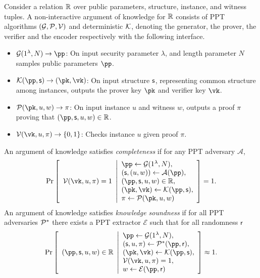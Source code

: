 \begin{definition}\label{def:nark}
   Consider a relation $\mathbb{R}$ over 
   public parameters, structure, instance, and witness tuples.
   A non-interactive argument of knowledge for $\mathbb{R}$ consists of PPT algorithms
   $(\mathcal{G}, \mathcal{P},\mathcal{V})$ 
   and deterministic $\mathcal{K}$,
   denoting the generator, 
   the prover,    
   the verifier
   and the encoder respectively with the following interface.
   \begin{itemize}
       \item $\Gn(1^{\lambda}, N) \to \pp$: 
       On input security parameter $\lambda$,
       and length parameter $N$
       samples public parameters $\pp$.
       \item $\En(\pp, \Str) \to (\pk, \vk)$: 
       On input structure $\mathsf{s}$, 
       representing common structure among instances,
       outputs the prover key $\pk$ and verifier key $\vk$.
       \item $\Po(\pk, u, w) \to \pi$: On input instance $u$ and
         witness $w$, outputs a proof $\pi$ proving that $(\pp, \Str, u, w) \in \R$.
       \item $\V(\vk, u, \pi) \to \{0, 1\}$: 
       Checks instance $u$ 
       given proof $\pi$.
   \end{itemize}
   An argument of knowledge satisfies \textit{completeness} if for any PPT adversary $\mathcal{A}$,
   \begin{align*}
   \Pr
   \left[
       \begin{array}{l}
       \V(\vk, u, \pi) = 1
       \end{array}
       \middle\vert
       \begin{array}{l}
       \pp \gets \Gn(1^{\lambda}, N),\\
       (\Str,(u, w)) \gets \mathcal{A}(\pp),\\
       (\pp, \Str, u, w) \in \R,\\
       (\pk, \vk) \gets \En(\pp, \Str),\\
       \pi \gets \Po(\pk, u, w)
       \end{array}
       \right]
   = 1.
   \end{align*}
   An argument of knowledge satisfies \textit{knowledge soundness} if for all PPT adversaries $\mathcal{P}^*$ there exists a PPT extractor $\mathcal{E}$ such that for all randomness $\mathsf{r}$
   \[
   \Pr
   \left[
       \begin{array}{l}
       (\pp, \Str, u, w) \in \R
       \end{array}
       \middle\vert
       \begin{array}{l}
       \pp \gets \Gn(1^{\lambda}, N),\\
       (\Str,u,\pi) \gets \Po^*(\pp, \mathsf{r}),\\
       (\pk, \vk) \gets \En(\pp, \Str),\\
       \V(\vk, u, \pi) = 1,\\
       w \gets \mathcal{E}(\pp, \mathsf{r})
       \end{array}
       \right]
   \approx 1.
   \]
\end{definition}

